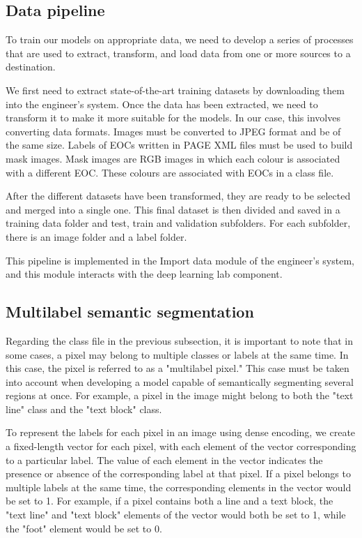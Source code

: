 \documentclass{polytech/polytech}
\numberwithin{figure}{chapter}
\begin{document}
\subsection{Data pipeline}

To train our models on appropriate data, we need to develop a series of processes that are used to extract, transform, and load data from one or more sources to a destination.

We first need to extract state-of-the-art training datasets by downloading them into the engineer's system.
Once the data has been extracted, we need to transform it to make it more suitable for the models.
In our case, this involves converting data formats.
Images must be converted to JPEG format and be of the same size.
Labels of EOCs written in PAGE XML files must be used to build mask images.
Mask images are RGB images in which each colour is associated with a different EOC.
These colours are associated with EOCs in a class file.

After the different datasets have been transformed, they are ready to be selected and merged into a single one.
This final dataset is then divided and saved in a training data folder and test, train and validation subfolders.
For each subfolder, there is an image folder and a label folder.

This pipeline is implemented in the Import data module of the engineer’s system, and this module interacts with the deep learning lab component.


\subsection{Multilabel semantic segmentation}

Regarding the class file in the previous subsection, it is important to note that in some cases, a pixel may belong to multiple classes or labels at the same time.
In this case, the pixel is referred to as a "multilabel pixel."
This case must be taken into account when developing a model capable of semantically segmenting several regions at once.
For example, a pixel in the image might belong to both the "text line" class and the "text block" class.

To represent the labels for each pixel in an image using dense encoding, we create a fixed-length vector for each pixel, with each element of the vector corresponding to a particular label.
The value of each element in the vector indicates the presence or absence of the corresponding label at that pixel.
If a pixel belongs to multiple labels at the same time, the corresponding elements in the vector would be set to 1.
For example, if a pixel contains both a line and a text block, the "text line" and "text block" elements of the vector would both be set to 1, while the "foot" element would be set to 0.
\end{document}
